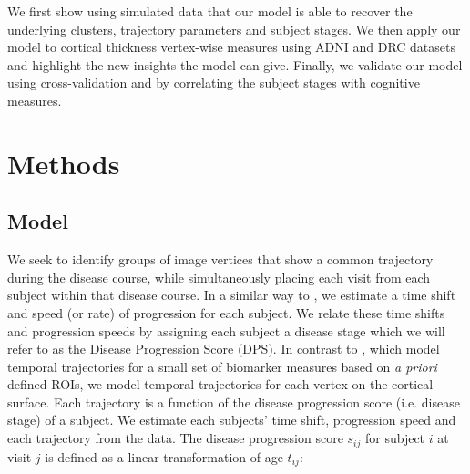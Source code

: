 We first show using simulated data that our model is able to recover the underlying clusters, trajectory parameters and subject stages. We then apply our model to cortical thickness vertex-wise measures using ADNI and DRC datasets and highlight the new insights the model can give. Finally, we validate our model using cross-validation and by correlating the subject stages with cognitive measures.


\section{Methods}
\label{sec:vwdpm_methods}

\subsection{Model}
\label{sec:vwdpm_model}

We seek to identify groups of image vertices that show a common trajectory during the disease course, while simultaneously placing each visit from each subject within that disease course. In a similar way to \cite{jedynak2012,donohue2014estimating,schiratti2015mixed}, we estimate a time shift and speed (or rate) of progression for each subject. We relate these time shifts and progression speeds by assigning each subject a disease stage which we will refer to as the Disease Progression Score (DPS). In contrast to \cite{jedynak2012,donohue2014estimating,schiratti2015mixed}, which model temporal trajectories for a small set of biomarker measures based on \emph{a priori} defined ROIs, we model temporal trajectories for each vertex on the cortical surface. Each trajectory is a function of the disease progression score (i.e. disease stage) of a subject. We estimate each subjects' time shift, progression speed and each trajectory from the data. The disease progression score $s_{ij}$ for subject $i$ at visit $j$ is defined as a linear transformation of age $t_{ij}$:


